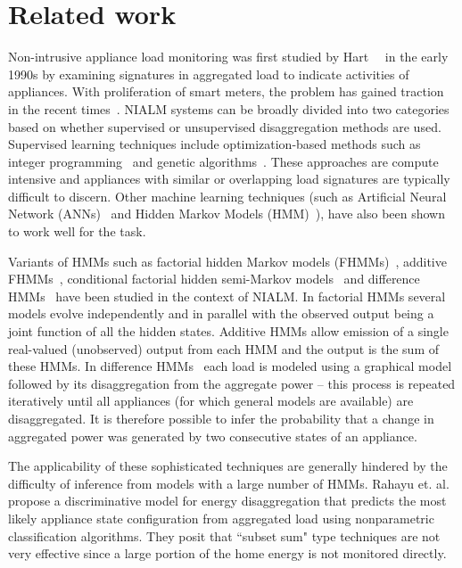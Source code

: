 \documentclass[conference]{IEEEtran}
\begin{document}
\vspace{-2mm}
\section{Related work}
\vspace{-1mm}
\noindent Non-intrusive appliance load monitoring was first studied by Hart~~\cite{hart} in the early 1990s by examining signatures in aggregated load to indicate activities of appliances. With proliferation of smart meters, the problem has gained traction in the recent times~\cite{survey1,survey2,survey3}. NIALM systems can be broadly divided into two categories based on whether supervised or unsupervised disaggregation methods are used.
\noindent Supervised learning techniques include optimization-based methods such as integer programming~\cite{Suzuki_08} and genetic algorithms~\cite{Baranski_04}. These approaches are compute intensive and appliances with similar or overlapping load signatures are typically difficult to discern. Other machine learning techniques (such as Artificial Neural Network (ANNs)~\cite{Ruzzelli_10} and Hidden Markov Models (HMM)~\cite{Zia_11}), have also been shown to work well for the task. 

\noindent Variants of HMMs such as factorial hidden Markov models (FHMMs)~\cite{Ghahramani_97a}, additive FHMMs~\cite{Kolter_12}, conditional factorial hidden semi-Markov models~\cite{Kim_11} and difference HMMs~\cite{parson2012_aaai} have been studied in the context of NIALM. In factorial HMMs several models evolve independently and in parallel with the observed output being a joint function of all the hidden states. Additive HMMs allow emission of a single real-valued (unobserved) output from each HMM and the output is the sum of these HMMs. In difference HMMs~\cite{parson2012_aaai} each load is modeled using a graphical model followed by its disaggregation from the aggregate power -- this process is repeated iteratively until all appliances (for which general models are available) are disaggregated. It is therefore possible to infer the probability that a change in aggregated power was generated by two consecutive states of an appliance. 

\noindent The applicability of these sophisticated techniques are generally hindered by the difficulty of inference from models with a large number of HMMs. Rahayu et. al.~\cite{Rahayu_12} propose a discriminative model for energy disaggregation that predicts the most likely appliance state configuration from aggregated load using nonparametric classification algorithms. They posit that ``subset sum" type techniques are not very effective since a large portion of the home energy is not monitored directly. 
\end{document}
